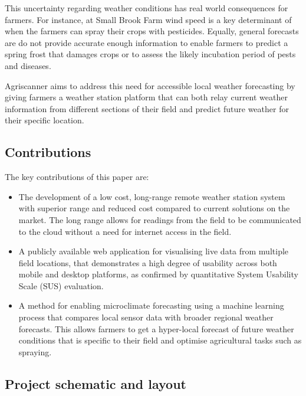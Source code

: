 This uncertainty regarding weather conditions has real world consequences for
farmers. For instance, at Small Brook Farm wind speed is a key determinant of
when the farmers can spray their crops with pesticides. Equally, general
forecasts are do not provide accurate enough information to enable farmers to
predict a spring frost that damages crops or to assess the likely incubation
period of pests and diseases.

Agriscanner aims to address this need for accessible local weather forecasting
by giving farmers a weather station platform that can both relay current weather
information from different sections of their field and predict future weather
for their specific location.

\subsection{Contributions}

The key contributions of this paper are:

\begin{itemize}
    \item The development of a low cost, long-range remote weather station
          system with superior range and reduced cost compared to current
          solutions on the market. The long range allows for readings from the
          field to be communicated to the cloud without a need for internet
          access in the field.
    \item A publicly available web application for visualising live data from
          multiple field locations, that demonstrates a high degree of usability
          across both mobile and desktop platforms, as confirmed by quantitative
          System Usability Scale (SUS) evaluation.
    \item A method for enabling microclimate forecasting using a machine
          learning process that compares local sensor data with broader regional
          weather forecasts. This allows farmers to get a hyper-local forecast
          of future weather conditions that is specific to their field and
          optimise agricultural tasks such as spraying.
\end{itemize}

\subsection{Project schematic and layout}

